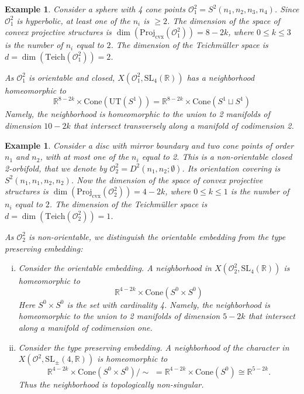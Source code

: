 \documentclass[a4paper,11pt]{article}
\newtheorem{Example}[Theorem]{Example}
\begin{document}
 
 
 
 
 
 \begin{Example} Consider a sphere with 4 cone points 
  $\mathcal O^2_1=S^2(n_1,n_2,n_3,n_4)$. 
  Since $\mathcal O^2_1$ is hyperbolic, at  
  least one of the $n_i$ is $\geq 2$.
  The dimension of the space of convex projective structures is 
  $\dim  (   \mathrm{Proj}_{\mathrm{cvx}}(\mathcal O^2_1))= 8-2 k $, where 
  $0\leq k\leq 3$ is the number of $n_i$ equal to $2$.
  The dimension of the Teichm\"uller space is 
  $d=\dim (\mathrm{Teich}(\mathcal O^2_1))=2$. 
  
  As $\mathcal O^2_1$ 
  is orientable and closed, $X(\mathcal O^2_1,\mathrm{SL}_4(\mathbb R))$
  has a neighborhood homeomorphic to
 $$ 
\mathbb R^{8-2k}\times  \mathrm{Cone}( \mathrm{UT}( S^{1}))= 
\mathbb R^{8-2k}\times    \mathrm{Cone}( S^{1}  \sqcup S^{1})
   $$
Namely,    the neighborhood is homeomorphic to the union to 2 manifolds of dimension $10-2k$
that intersect transversely along a manifold of codimension 2. 
 \end{Example}

 
 
 
 
 
 
 
 
 
 
 
 
 
 
 
   \begin{Example}
   Consider a disc with mirror boundary and two cone points of 
 order $n_1$ and $n_2$, with at most one of the $n_i$ equal to 2. This is a non-orientable closed 2-orbifold,
 that we denote by  $\mathcal O^2_2=D^2(n_1,n_2;\emptyset)$. Its orientation covering
 is $S^2(n_1, n_1, n_2, n_2)$. Now the dimension of the space of 
 convex projective structures is 
   $\dim  (   \mathrm{Proj}_{\mathrm{cvx}}(\mathcal O^2_2))= 4-2 k $, where 
  $0\leq k\leq 1$ is the number of $n_i$ equal to $2$. The dimension of the 
  Teichm\"uller space is
  $d=\dim (\mathrm{Teich}(\mathcal O^2_2))=1$. 
  
  As $\mathcal O^2_2$ is non-orientable, we distinguish the orientable embedding
  from the type preserving embedding:
  \begin{enumerate}[(i)]
   \item Consider the orientable embedding. A neighborhood in 
   $X(\mathcal O^2_2, \mathrm{SL}_4(\mathbb R))$ is homeomorphic to 
  $$
  \mathbb R^{4-2k}\times  \mathrm{Cone}( S^{0}\times S^0)
  $$
Here  $S^0\times S^0$ is the set with cardinality 4.
Namely,    the neighborhood is homeomorphic to the union to 2 manifolds of dimension $5-2k$ that intersect along a manifold of codimension one.
  \item Consider the type preserving embedding. A neighborhood  of the character  in 
  $X(\mathcal O^2, \mathrm{SL}_{\pm}(4,\mathbb R))$ is homeomorphic to 
  $$
  \mathbb R^{4-2k}\times  \mathrm{Cone}( S^{0}\times S^0)/\!\!\sim\,\, =
    \mathbb R^{4-2k}\times  \mathrm{Cone}(S^{0})\cong  \mathbb R^{5-2k}.
  $$
  Thus the neighborhood is topologically non-singular.
  
  \end{enumerate}
   \end{Example}
\end{document}
